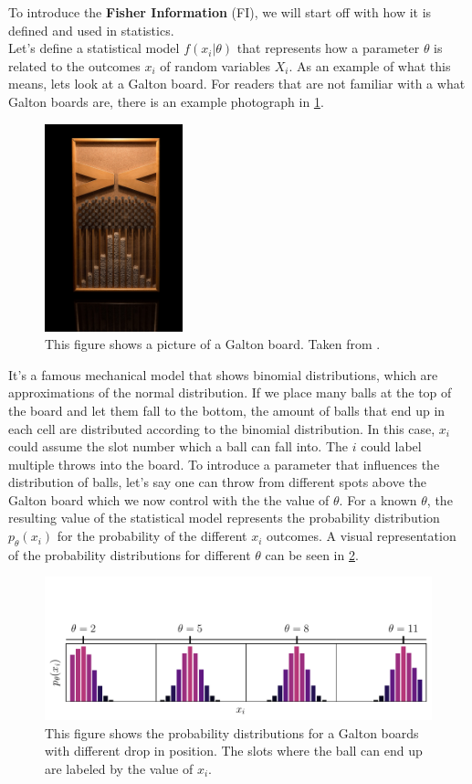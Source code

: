 To introduce the \textbf{Fisher Information} (FI), we will start off with how it is defined and used in statistics.\\
Let's define a statistical model $f(x_i|\theta)$ that represents how a parameter $\theta$ is related to the outcomes $x_i$ of random variables $X_i$\cite{StatisticFisherInfoTutorial}. As an example of what this means, lets look at a Galton board. For readers that are not familiar with a what Galton boards are, there is an example photograph in \cref{fig:GaltonPicture}. 
\begin{figure}
	\centering
	\includegraphics[width = 4cm]{text/FisherInformation/plots/GaltonBoard.jpg}
	\caption{This figure shows a picture of a Galton board. Taken from \cite{GaltonBoardPicture}.}
	\label{fig:GaltonPicture}
\end{figure}
It's a famous mechanical model that shows binomial distributions, which are approximations of the normal distribution. If we place many balls at the top of the board and let them fall to the bottom, the amount of balls that end up in each cell are distributed according to the binomial distribution. In this case, $x_i$ could assume the slot number which a ball can fall into. The $i$ could label multiple throws into the board. To introduce a parameter that influences the distribution of balls, let's say one can throw from different spots above the Galton board which we now control with the the value of $\theta$. For a known $\theta$, the resulting value of the statistical model represents the probability distribution $p_\theta(x_i)$ for the probability of the different $x_i$ outcomes. A visual representation of the probability distributions for different $\theta$ can be seen in \cref{fig:GaltonDistributions}.
\begin{figure}
	\centering
	\includegraphics[width = \textwidth, clip, trim= 0cm 0cm 0cm 2.3cm]{text/FisherInformation/plots/GaltonDistributionsPlot.pdf}
	\caption{This figure shows the probability distributions for a Galton boards with different drop in position. The slots where the ball can end up are labeled by the value of $x_i$.}
	\label{fig:GaltonDistributions}
\end{figure}\\
